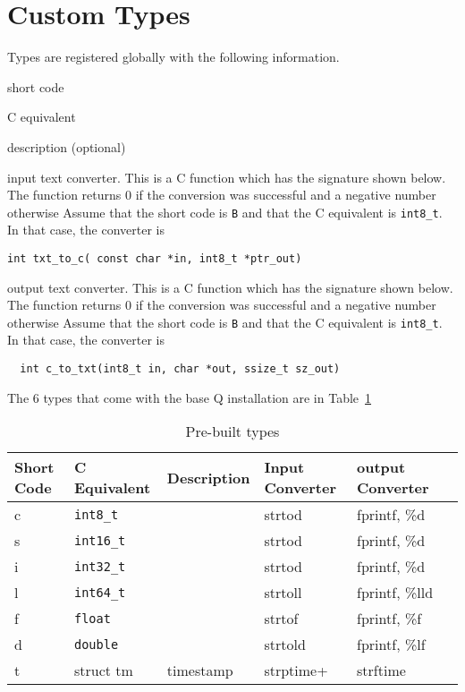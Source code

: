 \documentclass[letterpaper]{article}
\begin{document}
\section{Custom Types}
\label{custom_types}

Types are registered globally with the following information. 
\be
\item short code 
\item C equivalent
\item description (optional)
\item input text converter. This is a C function which has the
  signature shown below. 
The function returns 0 if the conversion was successful and a
  negative number otherwise
  Assume that the short code
  is {\tt B} and that the C equivalent is \verb+int8_t+. In that case, the
  converter is 
  \begin{verbatim}
int txt_to_c( const char *in, int8_t *ptr_out)
\end{verbatim}
\item output text converter. This is a C function which has the
  signature shown below. 
The function returns 0 if the conversion was successful and a
  negative number otherwise
  Assume that the short code
  is {\tt B} and that the C equivalent is \verb+int8_t+. In that case, the
  converter is 
  \begin{verbatim}
  int c_to_txt(int8_t in, char *out, ssize_t sz_out)
\end{verbatim}
  \ee

The 6 types that come with the base Q installation are in
Table~\ref{tbl_default_types}

\begin{table}[hb]
\centering
\begin{tabular}{|l|l|l|l|l|l|} \hline \hline
  {\bf Short Code} & {\bf C Equivalent} & {\bf Description} %
  & {\bf Input Converter} & {\bf output Converter} \\ \hline \hline
  c & \verb+int8_t+ &  & strtod & fprintf, \%d\\ \hline
  s & \verb+int16_t+ & & strtod & fprintf, \%d\\ \hline
  i & \verb+int32_t+ & & strtod & fprintf, \%d\\ \hline
  l & \verb+int64_t+ & & strtoll & fprintf, \%lld \\ \hline
  f & \verb+float+ &   & strtof & fprintf, \%f\\ \hline
  d & \verb+double+ &  & strtold & fprintf, \%lf\\ \hline
  t & struct tm & timestamp & strptime+ & strftime \\ \hline
\hline
\end{tabular}
\caption{Pre-built types}
\label{tbl_default_types}
\end{table}
\end{document}
